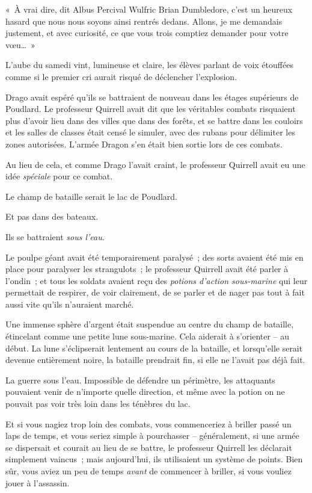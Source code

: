 «~À vrai dire, dit Albus Percival Wulfric Brian Dumbledore, c'est un heureux hasard que nous nous soyons ainsi rentrés dedans.
Allons, je me demandais justement, et avec curiosité, ce que vous trois comptiez demander pour votre vœu…~»

\later

L'aube du samedi vint, lumineuse et claire, les élèves parlant de voix étouffées comme si le premier cri aurait risqué de déclencher l'explosion.

\later

Drago avait espéré qu'ils se battraient de nouveau dans les étages supérieurs de Poudlard.
Le professeur Quirrell avait dit que les véritables combats risquaient plus d'avoir lieu dans des villes que dans des forêts, et se battre dans les couloirs et les salles de classes était censé le simuler, avec des rubans pour délimiter les zones autorisées.
L'armée Dragon s'en était bien sortie lors de ces combats.

Au lieu de cela, et comme Drago l'avait craint, le professeur Quirrell avait eu une idée \emph{spéciale} pour ce combat.

Le champ de bataille serait le lac de Poudlard.

Et pas dans des bateaux.

Ils se battraient \emph{sous l'eau}.

Le poulpe géant avait été temporairement paralysé~; des sorts avaient été mis en place pour paralyser les strangulots~; le professeur Quirrell avait été parler à l'ondin~; et tous les soldats avaient reçu des \emph{potions d'action sous-marine} qui leur permettait de respirer, de voir clairement, de se parler et de nager pas tout à fait aussi vite qu'ils n'auraient marché.

Une immense sphère d'argent était suspendue au centre du champ de bataille, étincelant comme une petite lune sous-marine.
Cela aiderait à s'orienter -- au début.
La lune s'éclipserait lentement au cours de la bataille, et lorsqu'elle serait devenue entièrement noire, la bataille prendrait fin, si elle ne l'avait pas déjà fait.

La guerre sous l'eau.
Impossible de défendre un périmètre, les attaquants pouvaient venir de n'importe quelle direction, et même avec la potion on ne pouvait pas voir très loin dans les ténèbres du lac.

Et si vous nagiez trop loin des combats, vous commenceriez à briller passé un laps de temps, et vous seriez simple à pourchasser -- généralement, si une armée se dispersait et courait au lieu de se battre, le professeur Quirrell les déclarait simplement vaincus~; mais aujourd'hui, ils utilisaient un système de points.
Bien sûr, vous aviez un peu de temps \emph{avant} de commencer à briller, si vous vouliez jouer à l'assassin.

